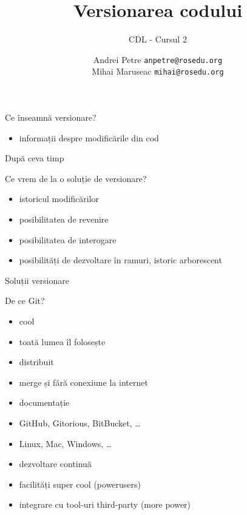 \documentclass{beamer}
\title[]{Versionarea codului}
\subtitle{CDL - Cursul 2}
\institute[]{ROSEdu}
\author[]{
  Andrei Petre \texttt{anpetre@rosedu.org}\\
  Mihai Maruseac \texttt{mihai@rosedu.org}
}
\begin{document}
\maketitle

\begin{frame}{Ce înseamnă versionare?}
  \begin{itemize}
    \item informații despre modificările din cod
  \end{itemize}
  \begin{center}
  \end{center}
\end{frame}

\begin{frame}{După ceva timp}
  \begin{center}
  \end{center}
\end{frame}

\begin{frame}{Ce vrem de la o soluție de versionare?}
  \begin{itemize}
    \item istoricul modificărilor
    \pause
    \item posibilitatea de revenire
      \pause
    \item posibilitatea de interogare
      \pause
    \item posibilități de dezvoltare în ramuri, istoric arborescent
  \end{itemize}
\end{frame}

\begin{frame}{Soluții versionare}
  \begin{center}
  \end{center}
\end{frame}

\begin{frame}{De ce Git?}
  \begin{itemize}
    \item cool
    \item toată lumea îl folosește
    \item distribuit
    \item merge și fără conexiune la internet
    \item documentație
    \item GitHub, Gitorious, BitBucket, \ldots
    \item Linux, Mac, Windows, \ldots
    \item dezvoltare continuă
    \item facilități super cool (powerusers)
    \item integrare cu tool-uri third-party (more power)
  \end{itemize}
  \vspace{-6cm}
  \begin{center}
    \hspace{6cm}
  \end{center}
\end{frame}
\end{document}
